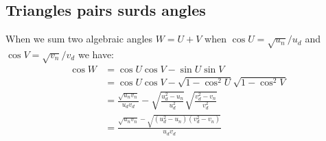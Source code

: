 \documentclass[11pt]{article}
\begin{document}
\subsection{Triangles pairs surds angles}

When we sum two algebraic angles $W = U+V$ when $\cos{U} = \sqrt{u_n}/u_d$ and $\cos{V} = \sqrt{v_n}/v_d$ we have:
\begin{align}
\cos{W} &= \cos{U}\cos{V} - \sin{U}\sin{V}\\
 &= \cos{U}\cos{V} - \sqrt{1 - \cos^2{U}}\sqrt{1 - \cos^2{V}}\\
 &= \frac{\sqrt{u_nv_n}}{u_dv_d} - \sqrt{\frac{u_d^2 - u_n}{u_d^2}} \sqrt{\frac{v_d^2 - v_n}{v_d^2}}\\
 &= \frac{\sqrt{u_nv_n} - \sqrt{(u_d^2 - u_n)(v_d^2 - v_n)} }{u_dv_d}
\end{align}
\end{document}
